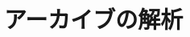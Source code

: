 \documentclass[a4paper,11pt,oneside,openany]{jsbook}
\begin{document}









\chapter{アーカイブの解析}
\end{document}

